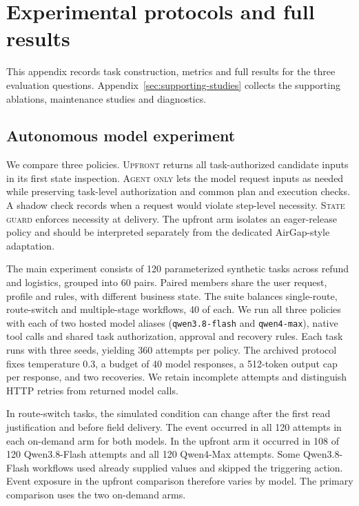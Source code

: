 \section{Experimental protocols and full results}
\label{sec:evaluation-details}
This appendix records task construction, metrics and full results for the three evaluation questions. Appendix~\ref{sec:supporting-studies} collects the supporting ablations, maintenance studies and diagnostics.




\subsection{Autonomous model experiment}
\label{sec:autonomous}
We compare three policies. \textsc{Upfront} returns all task-authorized candidate inputs in its first state inspection. \textsc{Agent only} lets the model request inputs as needed while preserving task-level authorization and common plan and execution checks. A shadow check records when a request would violate step-level necessity. \textsc{State guard} enforces necessity at delivery. The upfront arm isolates an eager-release policy and should be interpreted separately from the dedicated AirGap-style adaptation.

The main experiment consists of 120 parameterized synthetic tasks across refund and logistics, grouped into 60 pairs. Paired members share the user request, profile and rules, with different business state. The suite balances single-route, route-switch and multiple-stage workflows, 40 of each. We run all three policies with each of two hosted model aliases (\texttt{qwen3.8-flash} and \texttt{qwen4-max}), native tool calls and shared task authorization, approval and recovery rules. Each task runs with three seeds, yielding 360 attempts per policy. The archived protocol fixes temperature 0.3, a budget of 40 model responses, a 512-token output cap per response, and two recoveries. We retain incomplete attempts and distinguish HTTP retries from returned model calls.

In route-switch tasks, the simulated condition can change after the first read justification and before field delivery. The event occurred in all 120 attempts in each on-demand arm for both models. In the upfront arm it occurred in 108 of 120 Qwen3.8-Flash attempts and all 120 Qwen4-Max attempts. Some Qwen3.8-Flash workflows used already supplied values and skipped the triggering action. Event exposure in the upfront comparison therefore varies by model. The primary comparison uses the two on-demand arms.

